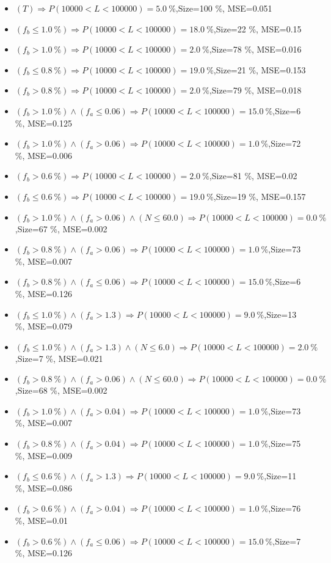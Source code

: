 \documentclass[numbered]{CSL}
\begin{document}
\begin{itemize}
\item $(T) \Rightarrow P(10 000 < L < 100 000) = 5.0~\%$,\hfill Size=100 \%, MSE=0.051
\item $(f_b \leq 1.0~\%) \Rightarrow P(10 000 < L < 100 000) = 18.0~\%$,\hfill Size=22 \%, MSE=0.15
\item $(f_b > 1.0~\%) \Rightarrow P(10 000 < L < 100 000) = 2.0~\%$,\hfill Size=78 \%, MSE=0.016
\item $(f_b \leq 0.8~\%) \Rightarrow P(10 000 < L < 100 000) = 19.0~\%$,\hfill Size=21 \%, MSE=0.153
\item $(f_b > 0.8~\%) \Rightarrow P(10 000 < L < 100 000) = 2.0~\%$,\hfill Size=79 \%, MSE=0.018
\item $(f_b > 1.0~\%) \land (f_a \leq 0.06) \Rightarrow P(10 000 < L < 100 000) = 15.0~\%$,\hfill Size=6 \%, MSE=0.125
\item $(f_b > 1.0~\%) \land (f_a > 0.06) \Rightarrow P(10 000 < L < 100 000) = 1.0~\%$,\hfill Size=72 \%, MSE=0.006
\item $(f_b > 0.6~\%) \Rightarrow P(10 000 < L < 100 000) = 2.0~\%$,\hfill Size=81 \%, MSE=0.02
\item $(f_b \leq 0.6~\%) \Rightarrow P(10 000 < L < 100 000) = 19.0~\%$,\hfill Size=19 \%, MSE=0.157
\item $(f_b > 1.0~\%) \land (f_a > 0.06) \land (N \leq 60.0) \Rightarrow P(10 000 < L < 100 000) = 0.0~\%$,\hfill Size=67 \%, MSE=0.002
\item $(f_b > 0.8~\%) \land (f_a > 0.06) \Rightarrow P(10 000 < L < 100 000) = 1.0~\%$,\hfill Size=73 \%, MSE=0.007
\item $(f_b > 0.8~\%) \land (f_a \leq 0.06) \Rightarrow P(10 000 < L < 100 000) = 15.0~\%$,\hfill Size=6 \%, MSE=0.126
\item $(f_b \leq 1.0~\%) \land (f_a > 1.3) \Rightarrow P(10 000 < L < 100 000) = 9.0~\%$,\hfill Size=13 \%, MSE=0.079
\item $(f_b \leq 1.0~\%) \land (f_a > 1.3) \land (N \leq 6.0) \Rightarrow P(10 000 < L < 100 000) = 2.0~\%$,\hfill Size=7 \%, MSE=0.021
\item $(f_b > 0.8~\%) \land (f_a > 0.06) \land (N \leq 60.0) \Rightarrow P(10 000 < L < 100 000) = 0.0~\%$,\hfill Size=68 \%, MSE=0.002
\item $(f_b > 1.0~\%) \land (f_a > 0.04) \Rightarrow P(10 000 < L < 100 000) = 1.0~\%$,\hfill Size=73 \%, MSE=0.007
\item $(f_b > 0.8~\%) \land (f_a > 0.04) \Rightarrow P(10 000 < L < 100 000) = 1.0~\%$,\hfill Size=75 \%, MSE=0.009
\item $(f_b \leq 0.6~\%) \land (f_a > 1.3) \Rightarrow P(10 000 < L < 100 000) = 9.0~\%$,\hfill Size=11 \%, MSE=0.086
\item $(f_b > 0.6~\%) \land (f_a > 0.04) \Rightarrow P(10 000 < L < 100 000) = 1.0~\%$,\hfill Size=76 \%, MSE=0.01
\item $(f_b > 0.6~\%) \land (f_a \leq 0.06) \Rightarrow P(10 000 < L < 100 000) = 15.0~\%$,\hfill Size=7 \%, MSE=0.126
\end{itemize}
\end{document}
